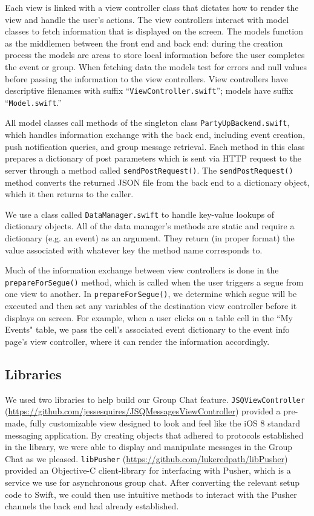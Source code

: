 \documentclass[12pt]{article}
\begin{document}
Each view is linked with a view controller class
that dictates how to render the view and handle the user's actions. 
The view controllers interact with model classes to fetch information 
that is displayed on the screen. 
The models function as the middlemen between the front end and back end: 
during the creation process the models are areas to store local information 
before the user completes the event or group. When fetching data the models 
test for errors and null values before passing the information to the view controllers.
View controllers have descriptive filenames with suffix ``\texttt{ViewController.swift}''; 
models have suffix ``\texttt{Model.swift}.''

All model classes call methods of the singleton class \texttt{PartyUpBackend.swift},
which handles information exchange with the back end, including event creation,
push notification queries, and group message retrieval.
Each method in this class prepares a dictionary of post parameters which is
sent via HTTP request to the server through a method called \texttt{sendPostRequest()}.
The \texttt{sendPostRequest()} method converts the returned JSON file from the back end to a dictionary object,
which it then returns to the caller.

We use a class called \texttt{DataManager.swift} to handle key-value lookups of dictionary objects.
All of the data manager's methods are static and require a dictionary (e.g. an event) as an argument.
They return (in proper format) the value associated with whatever key the method name corresponds to. 

Much of the information exchange between view controllers is done in the \texttt{prepareForSegue()} method,
which is called when the user triggers a segue from one view to another. In \texttt{prepareForSegue()},
we determine which segue will be executed and then set any variables of the destination view
controller before it displays on screen.
For example, when a user clicks on a table cell in the ``My Events" table,
we pass the cell's associated event dictionary to the event info page's view controller,
where it can render the information accordingly. 

\subsection{Libraries}

We used two libraries to help build our Group Chat feature.
\texttt{JSQViewController} (\url{https://github.com/jessesquires/JSQMessagesViewController})
provided a pre-made, fully customizable view designed to look and feel like the iOS 8 standard
messaging application.
By creating objects that adhered to protocols established in the library, we were able to display
and manipulate messages in the Group Chat as we pleased.
\texttt{libPusher} (\url{https://github.com/lukeredpath/libPusher}) provided an Objective-C
client-library for interfacing with Pusher, which is a service we use for asynchronous group
chat.
After converting the relevant setup code to Swift, we could then use intuitive methods to
interact with the Pusher channels the back end had already established.
\end{document}
